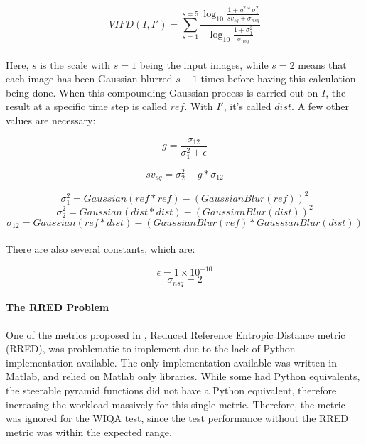 \documentclass[11pt,a4paper]{article}
\begin{document}
                $$VIFD(I, I') = \sum_{s = 1}^{s=5} \frac{
                        \log_{10} 
                        \frac{1 + g^2 * \sigma_{1}^2}
                        {sv_{sq} + \sigma_{nsq}}
                    }{
                        \log_{10}
                        \frac{1 + \sigma_{1}^2}
                        {\sigma_{nsq}}
                    }$$\\

                Here, $s$ is the scale with $s=1$ being the input images, while $s=2$ means that each image has been Gaussian blurred $s-1$ times before having this calculation being done.
                When this compounding Gaussian process is carried out on $I$, the result at a specific time step is called $ref$. With $I'$, it's called $dist$.
                A few other values are necessary:


                $$g = \frac{\sigma_{12}}{\sigma_{1}^2 + \epsilon}$$
                
                $$sv_{sq} = \sigma_{2}^2 - g*\sigma_{12}$$

                $$\sigma_{1}^2 = Gaussian(ref * ref) - (GaussianBlur(ref))^2$$
                $$\sigma_{2}^2 = Gaussian(dist * dist) - (GaussianBlur(dist))^2$$
                $$\sigma_{12} = Gaussian(ref * dist) - (GaussianBlur(ref) * GaussianBlur(dist))$$\\


                There are also several constants, which are:


                $$\epsilon = 1 \times 10^{-10}$$
                $$\sigma_{nsq} = 2$$

            \paragraph{The RRED Problem}
            One of the metrics proposed in \cite{ImageQualityAssessmentTest}, Reduced Reference Entropic Distance metric (RRED), was problematic to implement due to the lack of Python implementation available.
            The only implementation available was written in Matlab, and relied on Matlab only libraries. While some had Python equivalents, the steerable pyramid
            functions did not have a Python equivalent, therefore increasing the workload massively for this single metric. Therefore, the metric was ignored for the WIQA
            test, since the test performance without the RRED metric was within the expected range. 
            
            
\end{document}
